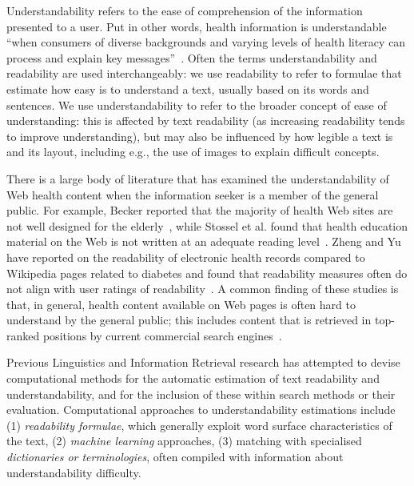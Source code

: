 \documentclass[10pt,a4paper]{article}
\begin{document}
\label{sec:related}
Understandability refers to the ease of comprehension of the information presented to a user. Put in other words, health information is understandable ``when consumers of diverse backgrounds and varying levels of health literacy can process and explain key messages''~\cite{shoemaker2014development}. Often the terms understandability and readability are used interchangeably: we use readability to refer to formulae that estimate how easy is to understand a text, usually based on its words and sentences. We use understandability to refer to the broader concept of ease of understanding: this is affected by text readability (as increasing readability tends to improve understanding), but may also be influenced by how legible a text is and its layout, including e.g., the use of images to explain difficult concepts.

There is a large body of literature that has examined the understandability of Web health content when the information seeker is a member of the general public. For example, Becker reported that the majority of health Web sites are not well designed for the elderly~\cite{becker04}, while Stossel et al. found that  health education material on the Web is not written at an adequate reading level~\cite{stossel12}. Zheng and Yu have reported on the readability of electronic health records compared to Wikipedia pages related to diabetes and found that readability measures often do not align with user ratings of readability~\cite{zheng2017readability}. 
A common finding of these studies is that, in general, health content available on Web pages is often hard to understand by the general public; this includes content that is retrieved in top-ranked positions by current commercial search engines~\cite{graber99,fitzsimmons10,wiener13,patel13,meillier17}.

Previous Linguistics and Information Retrieval research has attempted to devise computational methods for the automatic estimation of text readability and understandability, and for the inclusion of these within search methods or their evaluation. Computational approaches to understandability estimations include (1) \textit{readability formulae}, which generally exploit word surface characteristics of the text, (2) \textit{machine learning} approaches, (3) matching with specialised \textit{dictionaries or terminologies}, often compiled with information about understandability difficulty.
\end{document}
